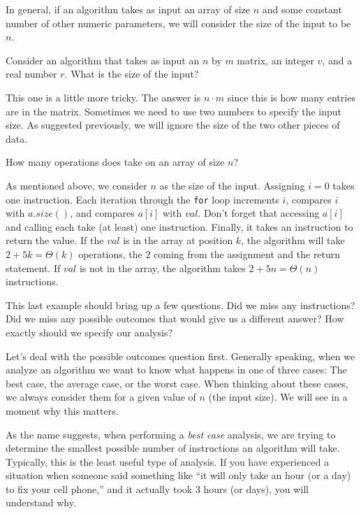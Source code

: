 In general, if an algorithm takes as input an array of size $n$ and some constant number of
other numeric parameters, we will consider the size of the input to be $n$.  

\begin{exer}
Consider an algorithm that takes as input an
$n$ by $m$ matrix, an integer $v$, and a real number $r$.  What is the size of the input?

\noindent
\answerline
\begin{answer}
This one is a little more tricky.  
The answer is $n\cdot m$ since this is how many entries are in the matrix.  
Sometimes we need to use two numbers to specify the input size.
As suggested previously, we will ignore the size of the two other pieces of data.
\end{answer}
\end{exer}

\begin{exa}
How many operations does  take on an array of size $n$?
\begin{sol}
As mentioned above, we consider $n$ as the size of the input.  
Assigning $i=0$ takes one instruction.  
Each iteration through the \verb+for+ loop increments $i$,
compares $i$ with $a.size()$, and compares $a[i]$ with $val$.  
Don't forget that accessing $a[i]$ and calling  
each take (at least) one instruction. 
Finally, it takes an
instruction to return the value.
If the $val$ is in the array at position $k$, the algorithm will take $2+5k=\Theta(k)$
operations, the $2$ coming from the assignment  and the return statement.  
If  $val$ is not in the array, the algorithm 
takes $2+5n=\Theta(n)$ instructions.
\end{sol}
\end{exa}

This last example should bring up a few questions.  Did we miss any instructions?  
Did we miss any possible outcomes that would give us a different answer?  How exactly should we specify our analysis?

Let's deal with the possible outcomes question first.  Generally speaking, when we analyze an algorithm we want to know what happens in one of three cases:  
The  best case, the average case, or the worst case. 
When thinking about these cases, 
we always consider them for a given value of $n$ (the input size).  
We will see in a moment why this matters.
 
As the name suggests, when performing a {\em best case} analysis, 
we are trying to determine the smallest
possible number of instructions an algorithm will take.  
Typically, this is the least useful type of analysis.
If you have experienced a situation when someone said something like 
``it will only take an hour (or a day) to fix your cell phone,'' 
and it actually took 3 hours (or days), you will understand why.  

